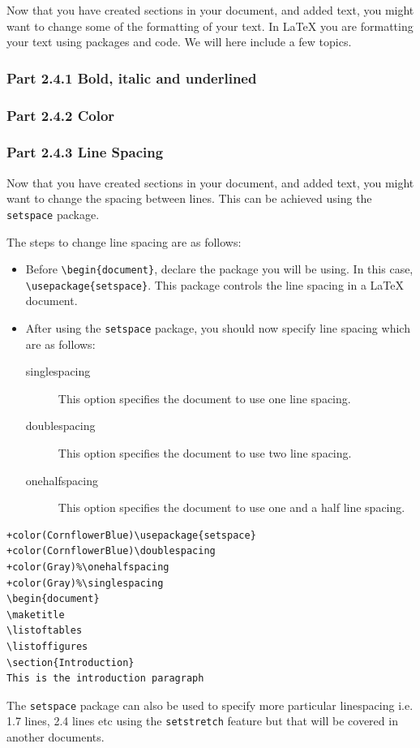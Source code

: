 \documentclass[12pts]{report}
\begin{document}
Now that you have created sections in your document, and added text, you might want to change some of the formatting of your text. In {\LaTeX} you are formatting your text using packages and code. We will here include a few topics.

\subsubsection*{Part 2.4.1 Bold, italic and underlined}

\subsubsection*{Part 2.4.2 Color}

\subsubsection*{Part 2.4.3 Line Spacing}
Now that you have created sections in your document, and added text, you might want to change the spacing between lines. This can be achieved using the \texttt{setspace} package. 

The steps to change line spacing are as follows:
\begin{itemize}
	\item Before \verb|\begin{document}|, declare the package you will be using. In this case, \verb|\usepackage{setspace}|. This package controls the line spacing in a {\LaTeX} document.
	\item After using the \texttt{setspace} package, you should now specify line spacing which are as follows:
	\begin{description}
		\item[singlespacing] This option specifies the document to use one line spacing.
		\item[doublespacing] This option specifies the document to use two line spacing.
		\item[onehalfspacing] This option specifies the document to use one and a half line spacing. 
	\end{description}
\end{itemize}
\begin{Verbatim}[commandchars=+\(\)]
+color(CornflowerBlue)\usepackage{setspace}
+color(CornflowerBlue)\doublespacing
+color(Gray)%\onehalfspacing
+color(Gray)%\singlespacing
\begin{document}
\maketitle
\listoftables
\listoffigures
\section{Introduction}
This is the introduction paragraph
\end{Verbatim}
The \texttt{setspace} package can also be used to specify more particular linespacing i.e. 1.7 lines, 2.4 lines etc using the \texttt{setstretch} feature but that will be covered in another documents. 
\end{document}
